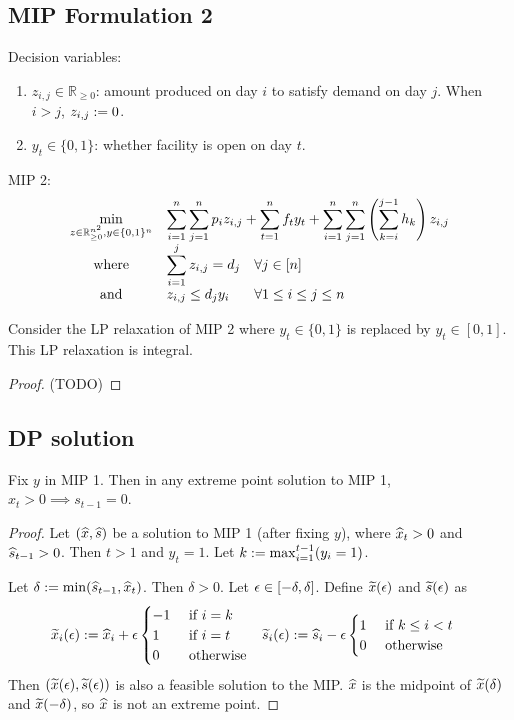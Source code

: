\documentclass[a4paper,12pt,fleqn]{article}
\newenvironment*{tightenum}{\begin{enumerate}[noitemsep]}{\end{enumerate}}
\newcommand*{\Rpos}{\mathbb{R}_{\ge 0}}
\newcommand*{\optprog}[3]{
\begin{array}{{>{\displaystyle}c}*2{>{\displaystyle}l}}
#1 & \multicolumn{2}{>{\displaystyle}l}{#2}
#3 \end{array}}
\begin{document}
\subsection{MIP Formulation 2}

Decision variables:
\begin{tightenum}
\item $z_{i,j} \in \Rpos$: amount produced on day $i$ to satisfy demand on day $j$.
    When $i > j$, $z_{i,j} := 0$.
\item $y_t \in \{0, 1\}$: whether facility is open on day $t$.
\end{tightenum}

MIP 2:
\[ \optprog{\min_{z \in \Rpos^{n^2}, y \in \{0, 1\}^n}}{%
\sum_{i=1}^n\sum_{j=1}^n p_iz_{i,j} + \sum_{t=1}^n f_ty_t
    + \sum_{i=1}^n\sum_{j=1}^n\left(\sum_{k=i}^{j-1} h_k\right)z_{i,j}}{
\\ \textrm{where} & \sum_{i=1}^j z_{i,j} = d_j & \forall j \in [n]
\\ \textrm{and} & z_{i,j} \le d_jy_i & \forall 1 \le i \le j \le n
} \]

\begin{lemma}
Consider the LP relaxation of MIP 2 where $y_t \in \{0, 1\}$ is replaced by $y_t \in [0, 1]$.
This LP relaxation is integral.
\end{lemma}
\begin{proof}(TODO)
\end{proof}

\subsection{DP solution}

\begin{lemma}
\label{thm:lot:zio}
Fix $y$ in MIP 1. Then in any extreme point solution to MIP 1, $x_t > 0 \implies s_{t-1} = 0$.
\end{lemma}
\begin{proof}
Let $(\widehat{x}, \widehat{s})$ be a solution to MIP 1 (after fixing $y$),
where $\widehat{x}_t > 0$ and $\widehat{s}_{t-1} > 0$. Then $t > 1$ and $y_t = 1$.
Let $k := \max_{i=1}^{t-1} (y_i = 1)$.

Let $\delta := \min(\widehat{s}_{t-1}, \widehat{x}_t)$.
Then $\delta > 0$. Let $\epsilon \in [-\delta, \delta]$.
Define $\widetilde{x}(\epsilon)$ and $\widetilde{s}(\epsilon)$ as
\begin{align*}
\widetilde{x}_i(\epsilon) &:= \widehat{x}_i + \epsilon\begin{cases}
-1 & \textrm{ if } i = k
\\ 1 & \textrm{ if } i = t
\\ 0 & \textrm{ otherwise}
\end{cases}
& \widetilde{s}_i(\epsilon) &:= \widehat{s}_i - \epsilon\begin{cases}
1 & \textrm{ if } k \le i < t
\\ 0 & \textrm{ otherwise}
\end{cases}
\end{align*}
Then $(\widetilde{x}(\epsilon), \widetilde{s}(\epsilon))$ is also a feasible solution to the MIP.
$\widehat{x}$ is the midpoint of $\widetilde{x}(\delta)$ and $\widetilde{x}(-\delta)$,
so $\widehat{x}$ is not an extreme point.
\end{proof}
\end{document}
